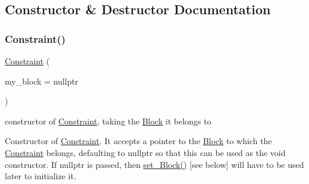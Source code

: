 \subsection{Constructor \& Destructor Documentation}
\mbox{\label{class_s_m_spp__di__unipi__it_1_1_constraint_a2877d5b993460277b70f1dbb6905f89e}} 
\subsubsection{\texorpdfstring{Constraint()}{Constraint()}\hspace{0.1cm}{\footnotesize\ttfamily [1/2]}}
{\footnotesize\ttfamily \mbox{\hyperlink{class_s_m_spp__di__unipi__it_1_1_constraint}{Constraint}} (\begin{DoxyParamCaption}\item[{\mbox{\hyperlink{class_s_m_spp__di__unipi__it_1_1_block}{Block}} $\ast$}]{my\+\_\+block = {\ttfamily nullptr} }\end{DoxyParamCaption})\hspace{0.3cm}{\ttfamily [inline]}}



constructor of \mbox{\hyperlink{class_s_m_spp__di__unipi__it_1_1_constraint}{Constraint}}, taking the \mbox{\hyperlink{class_s_m_spp__di__unipi__it_1_1_block}{Block}} it belongs to 

Constructor of \mbox{\hyperlink{class_s_m_spp__di__unipi__it_1_1_constraint}{Constraint}}. It accepts a pointer to the \mbox{\hyperlink{class_s_m_spp__di__unipi__it_1_1_block}{Block}} to which the \mbox{\hyperlink{class_s_m_spp__di__unipi__it_1_1_constraint}{Constraint}} belongs, defaulting to nullptr so that this can be used as the void constructor. If nullptr is passed, then \mbox{\hyperlink{class_s_m_spp__di__unipi__it_1_1_constraint_ae25adfb4d0355dc999de19a850b0025d}{set\+\_\+\+Block()}} \mbox{[}see below\mbox{]} will have to be used later to initialize it. \mbox{\label{class_s_m_spp__di__unipi__it_1_1_constraint_a1b46be6cc7a0e63b96a286617403d86b}} 
